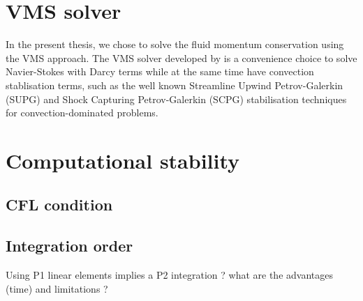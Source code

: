 \section{VMS solver}
In the present thesis, we chose to solve the fluid momentum conservation using the VMS approach. The VMS solver developed 
by \citet{hachem_stabilized_2010} is a convenience choice to solve Navier-Stokes with Darcy terms while at the same time 
have convection stablisation terms, such as the well known Streamline Upwind Petrov-Galerkin (SUPG) and Shock Capturing Petrov-Galerkin (SCPG)
stabilisation techniques for convection-dominated problems.


\section{Computational stability}
\subsection{CFL condition}
\subsection{Integration order}
Using P1 linear elements implies a P2 integration ? what are the advantages (time) and limitations ?

